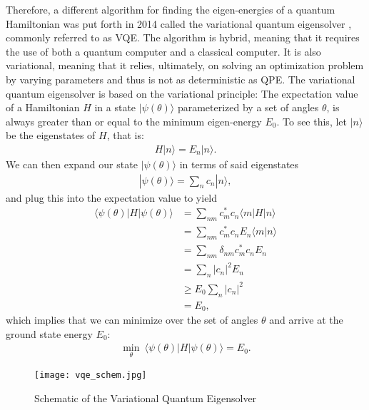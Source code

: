 \documentclass[10pt]{article}
\begin{document}
Therefore, a different algorithm for finding the eigen-energies of a quantum Hamiltonian was put forth in 2014 called the variational quantum eigensolver \cite{ref:vqe}, commonly referred to as VQE. The algorithm is hybrid, meaning that it requires the use of both a quantum computer and a classical computer. It is also variational, meaning that it relies, ultimately, on solving an optimization problem by varying parameters and thus is not as deterministic as QPE. The variational quantum eigensolver is based on the variational principle: The expectation value of a Hamiltonian $H$ in a state $|\psi(\theta)\rangle$ parameterized by a set of angles $\theta$, is always greater than or equal to the minimum eigen-energy $E_0$. To see this, let $|n\rangle$ be the eigenstates of $H$, that is:
\begin{align}
H|n\rangle=E_n|n\rangle
.\end{align}
We can then expand our state $|\psi(\theta)\rangle$ in terms of said eigenstates
\begin{align}
|\psi(\theta)\rangle=\sum_nc_n|n\rangle
,\end{align}
and plug this into the expectation value to yield
\begin{align}
\langle\psi(\theta)|H|\psi(\theta)\rangle
&=
\sum_{nm}c^*_mc_n\langle m|H|n \rangle
\nonumber
\\
&=
\sum_{nm}c^*_mc_nE_n\langle m|n \rangle
\nonumber
\\
&=
\sum_{nm}\delta_{nm}c^*_mc_nE_n
\nonumber
\\
&=
\sum_{n}|c_n|^2E_n
\nonumber
\\
&\geq
E_0\sum_{n}|c_n|^2
\nonumber
\\
&=
E_0
,\end{align}
which implies that we can minimize over the set of angles $\theta$ and arrive at the ground state energy $E_0$:
\begin{align}
\min_\theta \ \langle\psi(\theta)|H|\psi(\theta)\rangle
=
E_0
.\end{align}

\begin{figure}[h]
    \centering
    \texttt{[image: vqe\_schem.jpg]}
    \caption{Schematic of the Variational Quantum Eigensolver}
    \label{fig:vqe_schem}
\end{figure}
\end{document}
